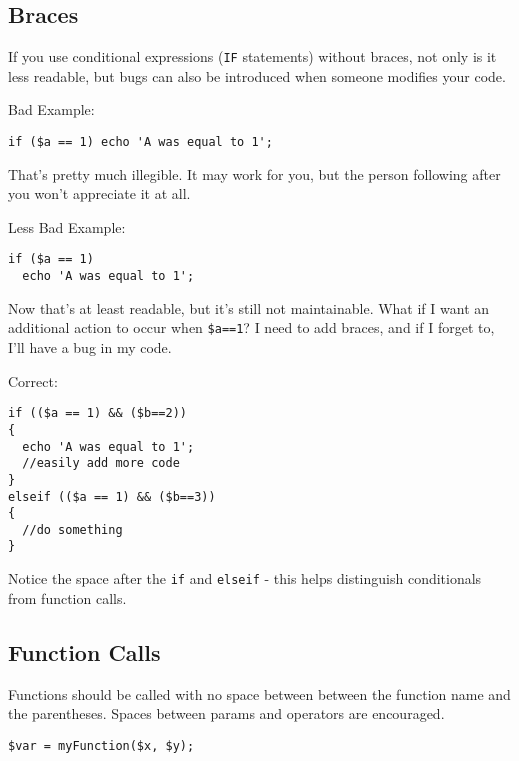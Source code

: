     \subsection{Braces}
        If you use conditional expressions (\texttt{IF} statements) without braces, not only is it less readable,
        but bugs can also be introduced when someone modifies your code.
        \begin{description}
        \item{Bad Example:}
\begin{lstlisting}[stepnumber=0,frame={}]
if ($a == 1) echo 'A was equal to 1';
\end{lstlisting}

        That's pretty much illegible. It may work for you, but the person following after you won't appreciate it at all.

        \item{Less Bad Example:}
\begin{lstlisting}[stepnumber=0,frame={}]
if ($a == 1)
  echo 'A was equal to 1';
\end{lstlisting}

        Now that's at least readable, but it's still not maintainable. What if I want an additional action to occur when
        \texttt{\$a==1}? I need to add braces, and if I forget to, I'll have a bug in my code.

        \item{Correct:}
\begin{lstlisting}[stepnumber=0,frame={}]
if (($a == 1) && ($b==2))
{
  echo 'A was equal to 1';
  //easily add more code
}
elseif (($a == 1) && ($b==3))
{
  //do something
}
\end{lstlisting}

            Notice the space after the \texttt{if} and \texttt{elseif} - this helps distinguish conditionals from function calls.
        \end{description}

    \subsection{Function Calls}
        Functions should be called with no space between between the function name and the parentheses.
        Spaces between params and operators are encouraged.

\begin{lstlisting}[stepnumber=0,frame={}]
$var = myFunction($x, $y);
\end{lstlisting}

